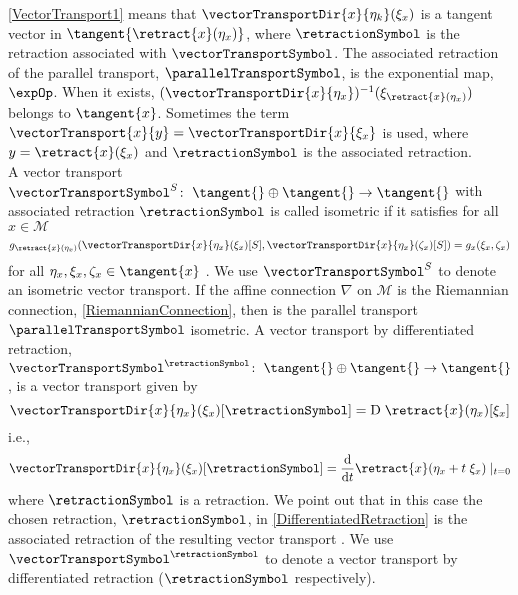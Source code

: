 \cref{VectorTransport1} means that $\vectorTransportDir{x}{\eta_k}(\xi_x)$ is a tangent vector in $\tangent{\retract{x}(\eta_x)}$, where $\retractionSymbol$ is the retraction associated with $\vectorTransportSymbol$. The associated retraction of the parallel transport, $\parallelTransportSymbol$, is the exponential map, $\expOp$. When it exists,
$(\vectorTransportDir{x}{\eta_x})^{-1}(\xi_{\retract{x}(\eta_x)})$ belongs to $\tangent{x}$. Sometimes the term $\vectorTransport{x}{y} = \vectorTransportDir{x}{\xi_x}$ is used, where $y = \retract{x}(\xi_x)$ and $\retractionSymbol$ is the associated retraction. \\
A vector transport $\vectorTransportSymbol^S \colon \; \tangent{} \oplus \tangent{} \to \tangent{}$ with associated retraction $\retractionSymbol$ is called isometric if it satisfies for all $x \in \mathcal{M}$
\begin{equation}\label{IsometricVectorTransport}
    g_{\retract{x}(\eta_x)}(\vectorTransportDir{x}{\eta_x}(\xi_x)[S], \vectorTransportDir{x}{\eta_x}(\zeta_x)[S]) = g_x (\xi_x, \zeta_x)
\end{equation}
for all $\eta_x, \xi_x, \zeta_x \in \tangent{x}$ \cite[p.~10]{Huang:2013}. We use $\vectorTransportSymbol^S$ to denote an isometric vector transport. If the affine connection $\nabla$ on $\mathcal{M}$ is the Riemannian connection, \cref{RiemannianConnection}, then is the parallel transport $\parallelTransportSymbol$ isometric. \newpage
A vector transport by differentiated retraction, $\vectorTransportSymbol^{\retractionSymbol} \colon \; \tangent{} \oplus \tangent{} \to \tangent{}$, is a vector transport given by
\begin{equation*}
    \vectorTransportDir{x}{\eta_x}(\xi_x)[\retractionSymbol] = \mathrm{D} \; \retract{x}(\eta_x)[\xi_x]
\end{equation*}
i.e.,
\begin{equation}\label{DifferentiatedRetraction}
    \vectorTransportDir{x}{\eta_x}(\xi_x)[\retractionSymbol] = \frac{\mathrm{d}}{\mathrm{d}t} \retract{x}(\eta_x + t \; \xi_x) \; \vert_{t=0}
\end{equation}
where $\retractionSymbol$ is a retraction. We point out that in this case the chosen retraction, $\retractionSymbol$, in \cref{DifferentiatedRetraction} is the associated retraction of the resulting vector transport \cite[p.~172]{AbsilMahonySepulchre:2008}. We use $\vectorTransportSymbol^{\retractionSymbol}$ to denote a vector transport by differentiated retraction ($\retractionSymbol$ respectively). \\